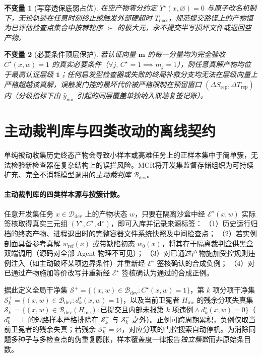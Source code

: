 \documentclass[UTF8,a4paper,10.5pt]{ctexart}
\newtheorem{inv}{不变量}
\newcommand{\method}{MCR}
\newcommand{\Ddev}{\mathcal{D}_{\mathrm{dev}}}
\newcommand{\Bdev}{\mathcal{B}_{\mathrm{dev}}}
\begin{document}
\begin{inv}[写穿透保底弱占优]
\label{inv:fallback}
在空产物零分约定 $Y^\star(x,\varnothing)=0$ 与原子改名机制下，无论轨迹在任意时刻终止或触发外部硬超时 $T_{\max}$，规范提交路径上的产物恒为已评估检查点集合中按棘轮序 $\succ$ 的极大元，永不提交半写损坏文件或退回空产物。
\end{inv}

\begin{inv}[必要条件顶层保护]
\label{inv:top}
若认证向量 $\mathbf{m}$ 的每一分量均为完全验收 $C^\star(x,w)=1$ 的真实必要条件（$\forall j,\, C^\star=1\implies m_j=1$），则任意真解产物均位于最高认证层级 $\mathbf{1}$；任何启发型检查器或失败的终局补救分支均无法在层级向量上严格超越该真解，误触发门控的最坏代价被严格限制在预留窗口 $(\Delta S_{\mathrm{rep}},\Delta T_{\mathrm{rep}})$ 内（分级指标下由 $\hat{y}_{\mathrm{mir}}$ 引起的同层覆盖单独纳入双端复签记账）。
\end{inv}

\section{主动裁判库与四类改动的离线契约}
\label{sec:bank}

单纯被动收集历史终态产物会导致小样本或高难任务上的正样本集中于简单簇，无法检验新检查器在复杂结构上的误拦风险。\method{}将开发集监督存储组织为可持续扩充、完全不消耗模型调用的\emph{主动裁判库} $\Bdev$。

\paragraph{主动裁判库的四类样本源与按簇计数。}
任意开发集任务 $x\in\Ddev$ 上的产物状态 $w$，只要在隔离沙盒中经 $\mathcal{E}^\star(x,w)$ 实际签核取得真实三元组 $(Y^\star,C^\star,\mathbf{d}^\star)$，即可入库并记录来源标签：
（1）历史运行归档的终态产物、进程退出时的完整容器文件系统快照及中间检查点；
（2）若实例剖面具备参考真解 $w_{\mathrm{ref}}(x)$ 或带缺陷初态 $w_0(x)$，将其存于隔离裁判盒供黑盒双端调用（源码对全部 Agent 物理不可见）；
（3）对已通过产物施加受控规则违例注入（如主动破坏某项边界条件）并重新经 $\mathcal{E}^\star$ 签核确认的合成负例；
（4）对已通过产物施加等价改写并重新经 $\mathcal{E}^\star$ 签核确认为通过的合成正例。

据此定义全局干净集 $\mathcal{S}^+=\{(x,w)\in\Bdev : C^\star(x,w)=1\}$，第 $k$ 项分项干净集 $\mathcal{S}^+_k=\{(x,w)\in\Bdev : d^\star_k(x,w)=1\}$，以及当前卫冕者 $H_{\mathrm{inc}}$ 的残余分项失真集 $\mathcal{S}^-_k=\{(x,w)\in\Bdev(H_{\mathrm{inc}}) : \text{已提交且内部未报第 }k\text{ 项违例}\land d^\star_k(x,w)=0\}$（$d^\star_k=\bot$ 的短路样本严格排除在 $\mathcal{S}^+_k$ 与 $\mathcal{S}^-_k$ 之外）。正例可跨周期累积，负例仅取当前卫冕者的残余失真；若残余 $\mathcal{S}^-_k=\varnothing$，对应分项的门控搜索自动停机。为消除同题多种子与多检查点的伪重复膨胀，样本覆盖度一律报告\emph{独立簇数}而非原始条目数。
\end{document}

